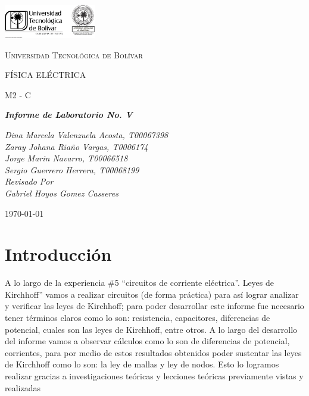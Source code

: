 \documentclass[letterpaper, 12pt]{article}
\begin{document}
\begin{titlepage}
	\centering
	\includegraphics[width=0.3\textwidth]{Images/logo_utb.png}\par\vspace{1cm}
	{\scshape\LARGE Universidad Tecnológica de Bolívar \par}
	\vspace{1cm}

	{\scshape\Large FÍSICA ELÉCTRICA \par}
	\vspace{.2cm}

	{\scshape\Large M2 - C \par}
	\vspace{1cm}
	\slshape {\Large \bfseries{}Informe de Laboratorio No. V\\}
	\vspace{1cm}

	\slshape {\itshape{} Dina Marcela Valenzuela Acosta, T00067398 \\}
	\slshape {\itshape{} Zaray Johana Riaño Vargas, T0006174 \\}
	\slshape {\itshape{} Jorge Marin Navarro, T00066518 \\}
	\slshape {\itshape{} Sergio Guerrero Herrera, T00068199 \\}
	\vfill
	Revisado Por \\
	Gabriel Hoyos Gomez Casseres\\
	{\large \today\par}
\end{titlepage}

\section{Introducción}

\nocite{magnetic-fields-khanacademy}
\nocite{kirchhoff}

A lo largo de la experiencia \#5 ``circuitos de corriente
eléctrica''. Leyes de Kirchhoff” vamos a realizar circuitos
(de forma práctica) para así lograr analizar y verificar
las leyes de Kirchhoff; para poder desarrollar este informe
fue necesario tener términos claros como lo son:
resistencia, capacitores, diferencias de potencial, cuales
son las leyes de Kirchhoff, entre otros. A lo largo del
desarrollo del informe vamos a observar cálculos como lo
son de diferencias de potencial, corrientes, para por medio
de estos resultados obtenidos poder sustentar las leyes de
Kirchhoff como lo son: la ley de mallas y ley de nodos.
Esto lo logramos realizar gracias a investigaciones
teóricas y lecciones teóricas previamente vistas y
realizadas
\end{document}
